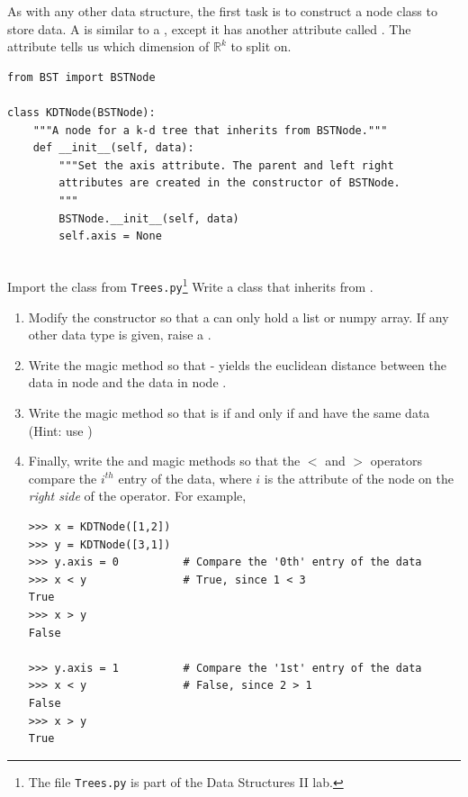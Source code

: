 As with any other data structure, the first task is to construct a node class to store data.
A  is similar to a , except it has another attribute called .
The  attribute tells us which dimension of $\mathbb{R}^k$ to split on.
\begin{lstlisting}
from BST import BSTNode

class KDTNode(BSTNode):
	"""A node for a k-d tree that inherits from BSTNode."""
	def __init__(self, data):
		"""Set the axis attribute. The parent and left right
        attributes are created in the constructor of BSTNode.
		"""
		BSTNode.__init__(self, data)
		self.axis = None
		
\end{lstlisting}

\begin{problem}
Import the  class from \texttt{Trees.py}\footnote{The file \texttt{Trees.py} is part of the Data Structures II lab.}
Write a  class that inherits from .
\begin{enumerate}
\item Modify the constructor so that a  can only hold a list or numpy array.
If any other data type is given, raise a .
\item Write the  magic method so that  -  yields the euclidean distance between the data in node  and the data in node .

\item Write the  magic method so that  is  if and only if  and  have the same data (Hint: use )

\item Finally, write the  and  magic methods so that the $<$ and $>$ operators compare the $i^{th}$ entry of the data, where $i$ is the  attribute of the node on the \emph{right side} of the operator.
For example,

\begin{lstlisting}
>>> x = KDTNode([1,2])
>>> y = KDTNode([3,1])
>>> y.axis = 0			# Compare the '0th' entry of the data 
>>> x < y				# True, since 1 < 3
True
>>> x > y
False

>>> y.axis = 1			# Compare the '1st' entry of the data
>>> x < y				# False, since 2 > 1
False
>>> x > y
True
\end{lstlisting}
\end{enumerate}
\end{problem}

